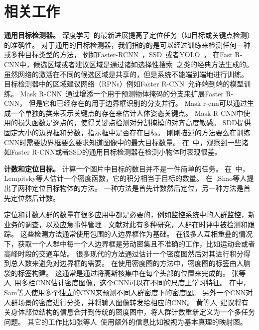 \documentclass[10pt,twocolumn,letterpaper,UTF8]{article}
\begin{document}
\section{相关工作}
\textbf{通用目标检测器。}
深度学习~\cite{deeplearningbook,nature}的最新进展提高了定位任务（如目标或关键点检测）的准确性。
对于通用的目标检测器，我们指的的是可以经过训练来检测任何一种或多种目标类型的方法，
例如Faster-RCNN~\cite{fastrcnn}，SSD~\cite{ssd}或者YOLO~\cite{redmon2016you}。
在Fast R-CNN中，候选区域或者建议区域是通过诸如选择性搜索~\cite{selectivesearch}之类的经典方法生成的。
虽然网络的激活在不同的候选区域是共享的，但是系统不能端到端地进行训练。
目标检测器中的区域建议网络（RPNs）例如Faster R-CNN~\cite{fastrcnn,fasterrcnn}允许端到端的模型训练。
Mask R-CNN~\cite{maskrcnn}通过增添一个用于预测物体掩码的分支来扩展Faster R-CNN，
但是它和已经存在的用于边界框识别的分支并行。
Mask r-cnn可以通过生成一个单独的类来表示关键点的存在来估计人体姿态关键点。
Mask R-CNN中使用的损失函数是逐点的，使得关键点检测对分割掩模的对齐高度敏感。
SDD提供固定大小的边界框和分数，指示框中是否存在目标。
刚刚描述的方法要么在训练CNN时需要边界框要么要求知道图像中的最大目标数量。
在~\cite{huang2017}中，观察到一些诸如Faster R-CNN或者SSD的通用目标检测器在检测小物体时表现很差。



\textbf{计数和定位目标。}
计算一个图片中目标的数目并不是一件简单的任务。
在~\cite{lempitsky_2010}中，Lempitsky等人估计一个密度函数，它的积分相当于目标的数量。
在~\cite{shao_2015},Shao等人提出了两种定位目标物体的方法。
一种方法是首先计数然后定位，另一种方法是首先定位然后计数。

定位和计数人群的数量在很多应用中都是必要的，例如监控系统中的人群监控，新业务的调查，以及应急事件管理 \cite{lempitsky_2010,xiong2017}.
文献对此有多种研究，人群在时评中被检测和跟踪。
这些检测方法通常使用包围的人边界框作为基础。
在很多人互相重叠的情况下，获取一个人群中每一个人边界框是劳动密集且不准确的工作，比如运动会或者高峰时段的交通车站。
很多现代的方法通过估计一个密度图然后对其进行积分得到总人数来避免对边界框的需要。
在使用密度图的方法中，密度图的标签由人脑袋的标签构建。
这通常是通过将高斯核集中在每个头部的位置来完成的。
张等人~\cite{zhang2016}用多栏CNN估计密度图像，这个CNN可以在不同的尺度上学习特征。
在\cite{sam2017}中，Sam等人使用多个独立的CNN来预测不同人群密度下的密度图。
另外一个CNN对人群场景的密度进行分类，并将输入图像转发给相应的CNN。
黄等人~\cite{huang2018}建议将有关身体部位结构的信息合并到传统的密度图中，将人群计数重新定义为一个多任务问题。
其它的工作比如张等人~\cite{zhang2015}使用额外的信息比如被视为基本真理的映射图。
\end{document}
